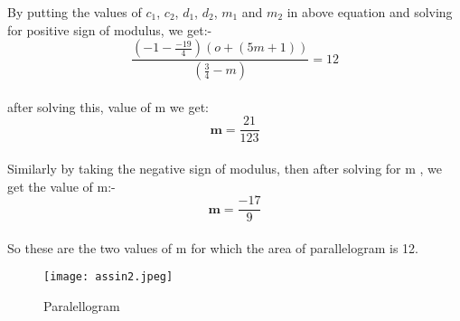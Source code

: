 \documentclass[journal,12pt,twocolumn]{IEEEtran}
\begin{document}
By putting the values of $c_1$, $c_2$, $d_1$, $d_2$, $m_1$ and $m_2$ in above equation and solving for positive sign of modulus, we get:-\\
$$\frac{(-1-\frac{-19}{4})(o+(5m+1))}{(\frac{3}{4}-m)}=12$$\\
after solving this, value of m we get:\\
$$\textbf{m}=\frac{21}{123}$$\\

Similarly by taking the negative sign of modulus, then after solving for m , we get the value of m:-\\
$$\textbf{m}=\frac{-17}{9}$$\\

So these are the two values of m for which the area of parallelogram is 12.



\begin{figure}
\begin{center}
    \texttt{[image: assin2.jpeg]}
    \caption{Paralellogram}

\end{center}
\end{figure}
\end{document}
